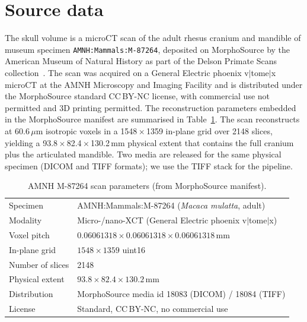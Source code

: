 \documentclass{compactarticle}
\begin{document}
\section{Source data}
\label{sec:source}

The skull volume is a microCT scan of the adult rhesus cranium and
mandible of museum specimen \texttt{AMNH:Mammals:M-87264}, deposited on
MorphoSource by the American Museum of Natural History as part of the
Delson Primate Scans collection~\cite{copes-sci-data-2016}. The scan
was acquired on a General Electric phoenix v$\vert$tome$\vert$x microCT
at the AMNH Microscopy and Imaging Facility and is distributed under
the MorphoSource standard CC\,BY-NC license, with commercial use not
permitted and 3D printing permitted. The reconstruction parameters
embedded in the MorphoSource manifest are summarised in
Table~\ref{tab:scan-params}. The scan reconstructs at 60.6\,$\mu$m
isotropic voxels in a 1548\,$\times$\,1359 in-plane grid over 2148
slices, yielding a 93.8\,$\times$\,82.4\,$\times$\,130.2\,mm physical
extent that contains the full cranium plus the articulated mandible.
Two media are released for the same physical specimen (DICOM and TIFF
formats); we use the TIFF stack for the pipeline.

\begin{table}[H]
\centering
\caption{AMNH M-87264 scan parameters (from MorphoSource manifest).}
\label{tab:scan-params}
\small
\begin{tabular}{ll}
\hline
Specimen           & AMNH:Mammals:M-87264 (\emph{Macaca mulatta}, adult) \\
Modality           & Micro-/nano-XCT (General Electric phoenix v$\vert$tome$\vert$x) \\
Voxel pitch        & $0.06061318 \times 0.06061318 \times 0.06061318$\,mm \\
In-plane grid      & $1548 \times 1359$ uint16 \\
Number of slices   & 2148 \\
Physical extent    & $93.8 \times 82.4 \times 130.2$\,mm \\
Distribution       & MorphoSource media id 18083 (DICOM) / 18084 (TIFF) \\
License            & Standard, CC\,BY-NC, no commercial use \\
\hline
\end{tabular}
\end{table}
\end{document}
